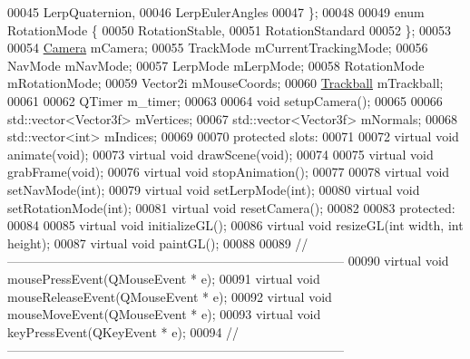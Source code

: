 \begin{DoxyCode}
00045       LerpQuaternion,
00046       LerpEulerAngles
00047     \};
00048 
00049     \textcolor{keyword}{enum} RotationMode \{
00050       RotationStable,
00051       RotationStandard
00052     \};
00053 
00054     \hyperlink{class_camera}{Camera} mCamera;
00055     TrackMode mCurrentTrackingMode;
00056     NavMode mNavMode;
00057     LerpMode mLerpMode;
00058     RotationMode mRotationMode;
00059     Vector2i mMouseCoords;
00060     \hyperlink{class_trackball}{Trackball} mTrackball;
00061 
00062     QTimer m\_timer;
00063 
00064     \textcolor{keywordtype}{void} setupCamera();
00065 
00066     std::vector<Vector3f> mVertices;
00067     std::vector<Vector3f> mNormals;
00068     std::vector<int> mIndices;
00069 
00070   \textcolor{keyword}{protected} slots:
00071 
00072     \textcolor{keyword}{virtual} \textcolor{keywordtype}{void} animate(\textcolor{keywordtype}{void});
00073     \textcolor{keyword}{virtual} \textcolor{keywordtype}{void} drawScene(\textcolor{keywordtype}{void});
00074 
00075     \textcolor{keyword}{virtual} \textcolor{keywordtype}{void} grabFrame(\textcolor{keywordtype}{void});
00076     \textcolor{keyword}{virtual} \textcolor{keywordtype}{void} stopAnimation();
00077 
00078     \textcolor{keyword}{virtual} \textcolor{keywordtype}{void} setNavMode(\textcolor{keywordtype}{int});
00079     \textcolor{keyword}{virtual} \textcolor{keywordtype}{void} setLerpMode(\textcolor{keywordtype}{int});
00080     \textcolor{keyword}{virtual} \textcolor{keywordtype}{void} setRotationMode(\textcolor{keywordtype}{int});
00081     \textcolor{keyword}{virtual} \textcolor{keywordtype}{void} resetCamera();
00082 
00083   \textcolor{keyword}{protected}:
00084 
00085     \textcolor{keyword}{virtual} \textcolor{keywordtype}{void} initializeGL();
00086     \textcolor{keyword}{virtual} \textcolor{keywordtype}{void} resizeGL(\textcolor{keywordtype}{int} width, \textcolor{keywordtype}{int} height);
00087     \textcolor{keyword}{virtual} \textcolor{keywordtype}{void} paintGL();
00088     
00089     \textcolor{comment}{//--------------------------------------------------------------------------------}
00090     \textcolor{keyword}{virtual} \textcolor{keywordtype}{void} mousePressEvent(QMouseEvent * e);
00091     \textcolor{keyword}{virtual} \textcolor{keywordtype}{void} mouseReleaseEvent(QMouseEvent * e);
00092     \textcolor{keyword}{virtual} \textcolor{keywordtype}{void} mouseMoveEvent(QMouseEvent * e);
00093     \textcolor{keyword}{virtual} \textcolor{keywordtype}{void} keyPressEvent(QKeyEvent * e);
00094     \textcolor{comment}{//--------------------------------------------------------------------------------}

\end{DoxyCode}
